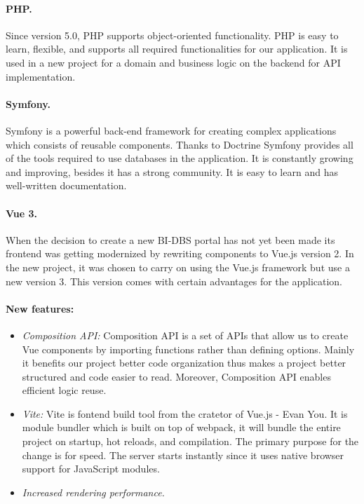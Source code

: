 \paragraph*{PHP.} Since version 5.0, PHP supports object-oriented functionality\cite{php-oop}. PHP is easy to learn, flexible, and supports all required functionalities for our application. It is used in a new project for a domain and business logic on the backend for API implementation.

\paragraph*{Symfony.} Symfony is a powerful back-end framework for creating complex applications which consists of reusable components.\cite{symphony-doc} Thanks to Doctrine Symfony provides all of the tools required to use databases in the application. It is constantly growing and improving, besides it has a strong community. It is easy to learn and has well-written documentation.


\paragraph*{Vue 3.} When the decision to create a new BI-DBS portal has not yet been made its frontend was getting modernized by rewriting components to Vue.js version 2. In the new project, it was chosen to carry on using the Vue.js framework but use a new version 3. This version comes with certain advantages for the application.\cite{vue3-updates}

\paragraph*{New features:}
\begin{itemize}
  \item \emph{Composition API:} Composition API is a set of APIs that allow us to create Vue components by importing functions rather than defining options. Mainly it benefits our project better code organization thus makes a project better structured and code easier to read. Moreover, Composition API enables efficient logic reuse.\cite{compositionapi-doc}
  
   \item \emph{Vite:} Vite is fontend build tool from the cratetor of Vue.js - Evan You. It is module bundler which is built on top of webpack, it will bundle the entire project on startup, hot reloads, and compilation. The primary purpose for the change is for speed. The server starts instantly since it uses native browser support for JavaScript modules.\cite{vite-doc}

   \item \emph{Increased rendering performance.}

\end{itemize}

